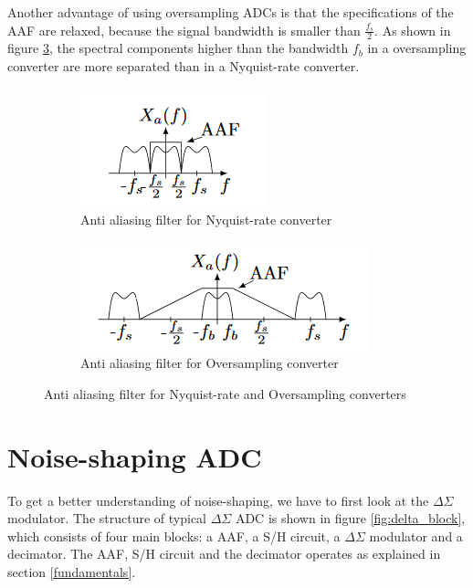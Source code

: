 Another advantage of using oversampling ADCs is that the specifications of the AAF are relaxed, because the signal bandwidth is smaller than $\frac{f_s}{2}$. As shown in figure \ref{fig:AAF}, the spectral components higher than the bandwidth $f_b$ in a oversampling converter are more separated than in a Nyquist-rate converter. 

\begin{figure}
\centering
\begin{subfigure}[b]{0.35\textwidth}
   \includegraphics[width=1\linewidth]{images/nyquist_aaf.png}
   \caption{Anti aliasing filter for Nyquist-rate converter}
   \label{fig:AAf_NQ} 
\end{subfigure}

\begin{subfigure}[b]{0.55\textwidth}
   \includegraphics[width=1\linewidth]{images/over_aaf.png}
   \caption{Anti aliasing filter for Oversampling converter}
   \label{fig:AAF_OV}
\end{subfigure}

\caption{Anti aliasing filter for Nyquist-rate and Oversampling converters}
\label{fig:AAF}
\end{figure}

\section{Noise-shaping ADC}
To get a better understanding of noise-shaping, we have to first look at the $\Delta\Sigma$ modulator. The structure of typical $\Delta\Sigma$ ADC is shown in figure \ref{fig:delta_block}, which consists of four main blocks: a AAF, a S/H circuit, a $\Delta\Sigma$ modulator and a decimator. The AAF, S/H circuit and the decimator operates as explained in section \ref{fundamentals}.

